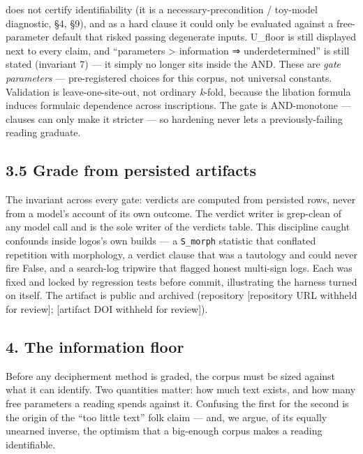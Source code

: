 \documentclass[
  10pt,
]{article}
\begin{document}
does not certify identifiability (it is a necessary-precondition /
toy-model diagnostic, §4, §9), and as a hard clause it could only be
evaluated against a free-parameter default that risked passing
degenerate inputs. U\_floor is still displayed next to every claim, and
``parameters \textgreater{} information ⇒ underdetermined'' is still
stated (invariant 7) --- it simply no longer sits inside the AND. These
are \emph{gate parameters} --- pre-registered choices for this corpus,
not universal constants. Validation is leave-one-site-out, not ordinary
\emph{k}-fold, because the libation formula induces formulaic dependence
across inscriptions. The gate is AND-monotone --- clauses can only make
it stricter --- so hardening never lets a previously-failing reading
graduate.

\hypertarget{grade-from-persisted-artifacts}{%
\subsection{3.5 Grade from persisted
artifacts}\label{grade-from-persisted-artifacts}}

The invariant across every gate: verdicts are computed from persisted
rows, never from a model's account of its own outcome. The verdict
writer is grep-clean of any model call and is the sole writer of the
verdicts table. This discipline caught confounds inside logos's own
builds --- a \texttt{S\_morph} statistic that conflated repetition with
morphology, a verdict clause that was a tautology and could never fire
False, and a search-log tripwire that flagged honest multi-sign logs.
Each was fixed and locked by regression tests before commit,
illustrating the harness turned on itself. The artifact is public and
archived (repository {[}repository URL withheld for review{]};
{[}artifact DOI withheld for review{]}).

\hypertarget{the-information-floor}{%
\subsection{4. The information floor}\label{the-information-floor}}

Before any decipherment method is graded, the corpus must be sized
against what it can identify. Two quantities matter: how much text
exists, and how many free parameters a reading spends against it.
Confusing the first for the second is the origin of the ``too little
text'' folk claim --- and, we argue, of its equally unearned inverse,
the optimism that a big-enough corpus makes a reading identifiable.
\end{document}

